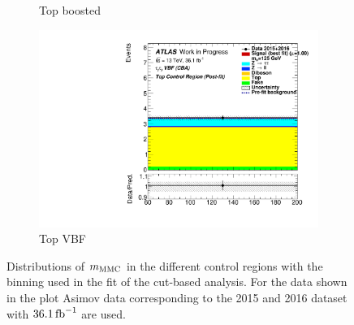\begin{figure}[htb]
\begin{subfigure}[t]{0.45\textwidth}
        \caption{Top boosted}
    \end{subfigure}
    \begin{subfigure}[t]{0.45\textwidth}
        \includegraphics[width=\textwidth]{./plots/fit/cba/top_vbf.pdf}
        \caption{Top VBF}
    \end{subfigure}

    \caption{Distributions of $m_\text{MMC}$ in the different control regions with the binning used in the fit of the cut-based analysis.
             For the data shown in the plot Asimov data corresponding to the 2015 and 2016 dataset with $\SI{36.1}{\invfb}$ are used.}\label{fig:fit:input:cba:CR}
\end{figure}


